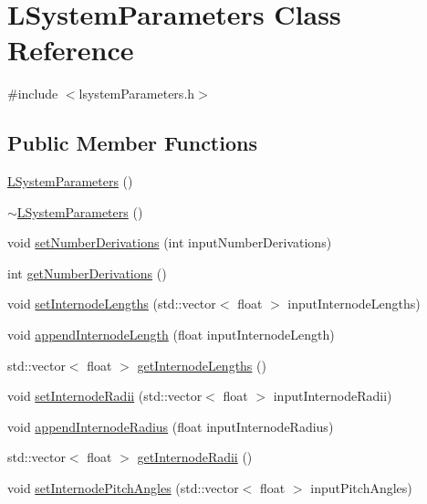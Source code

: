 \hypertarget{classLSystemParameters}{\section{L\-System\-Parameters Class Reference}
\label{classLSystemParameters}
}


{\ttfamily \#include $<$lsystem\-Parameters.\-h$>$}

\subsection*{Public Member Functions}
\begin{DoxyCompactItemize}
\item 
\hyperlink{classLSystemParameters_a23ecf893047602d4076b70d46e3d13f1}{L\-System\-Parameters} ()
\item 
\hyperlink{classLSystemParameters_a0cccedff9fc2f0ea82a5f3a89106a6de}{$\sim$\-L\-System\-Parameters} ()
\item 
void \hyperlink{classLSystemParameters_a14e47fea48f4d73bd363e86bc9ae8f85}{set\-Number\-Derivations} (int input\-Number\-Derivations)
\item 
int \hyperlink{classLSystemParameters_a922f8a577c222df6330735bc6f9dd847}{get\-Number\-Derivations} ()
\item 
void \hyperlink{classLSystemParameters_ac2d66eb83df0a7569285c77777b59555}{set\-Internode\-Lengths} (std\-::vector$<$ float $>$ input\-Internode\-Lengths)
\item 
void \hyperlink{classLSystemParameters_aa3b4318d190e105b629225eaa624efc8}{append\-Internode\-Length} (float input\-Internode\-Length)
\item 
std\-::vector$<$ float $>$ \hyperlink{classLSystemParameters_af91d7c9254210830a3c7ead31c54cae9}{get\-Internode\-Lengths} ()
\item 
void \hyperlink{classLSystemParameters_ae602c3d680038b52145d2e9c57f10900}{set\-Internode\-Radii} (std\-::vector$<$ float $>$ input\-Internode\-Radii)
\item 
void \hyperlink{classLSystemParameters_a1a91050d244b8f758ae67f1d75afcaa2}{append\-Internode\-Radius} (float input\-Internode\-Radius)
\item 
std\-::vector$<$ float $>$ \hyperlink{classLSystemParameters_ad74efb57707873999645bf4b542d1f18}{get\-Internode\-Radii} ()
\item 
void \hyperlink{classLSystemParameters_a9e0f7914e97c1998009ef34d15e23025}{set\-Internode\-Pitch\-Angles} (std\-::vector$<$ float $>$ input\-Pitch\-Angles)

\end{DoxyCompactItemize}
